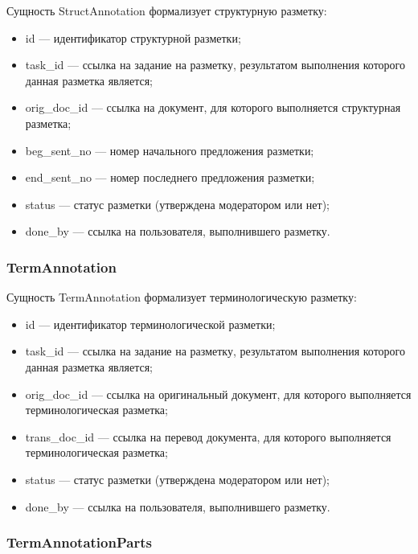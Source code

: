 Сущность StructAnnotation формализует структурную разметку:
\begin{itemize}
    \item id --- идентификатор структурной разметки;
    \item task\_id --- ссылка на задание на разметку, результатом выполнения которого данная разметка является;
    \item orig\_doc\_id --- ссылка на документ, для которого выполняется структурная разметка;
    \item beg\_sent\_no --- номер начального предложения разметки;
    \item end\_sent\_no --- номер последнего предложения разметки;
    \item status --- статус разметки (утверждена модератором или нет);
    \item done\_by --- ссылка на пользователя, выполнившего разметку.
\end{itemize}

\subsubsection*{TermAnnotation}

Сущность TermAnnotation формализует терминологическую разметку:
\begin{itemize}
    \item id --- идентификатор терминологической разметки;
    \item task\_id --- ссылка на задание на разметку, результатом выполнения которого данная разметка является;
    \item orig\_doc\_id --- ссылка на оригинальный документ, для которого выполняется терминологическая разметка;
    \item trans\_doc\_id --- ссылка на перевод документа, для которого выполняется терминологическая разметка;
    \item status --- статус разметки (утверждена модератором или нет);
    \item done\_by --- ссылка на пользователя, выполнившего разметку.
\end{itemize}

\subsubsection*{TermAnnotationParts}

